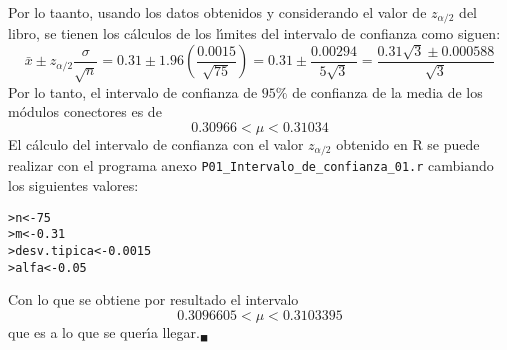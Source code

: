 \begin{solucion}
\begin{equation*}
 \end{equation*}
 Por lo taanto, usando los datos obtenidos y considerando el valor de $z_{\alpha/2}$ del libro, se tienen los c\'alculos de los l\'{\i}mites del intervalo de confianza como siguen:
 \begin{equation*}
  \bar{x}\pm z_{\alpha/2}\frac{\sigma}{\sqrt{n}} = 0.31\pm 1.96\left( \frac{0.0015}{\sqrt{75}} \right) = 0.31\pm\frac{0.00294}{5\sqrt{3}} = \frac{0.31\sqrt{3}\pm0.000588}{\sqrt{3}}
 \end{equation*}
 Por lo tanto, el intervalo de confianza de $95\%$ de confianza de la media de los m\'odulos conectores es de
 \begin{equation*}
  0.30966 < \mu < 0.31034
 \end{equation*}
 El c\'alculo del intervalo de confianza con el valor $z_{\alpha/2}$ obtenido en R se puede realizar con el programa anexo \texttt{P01\_Intervalo\_de\_confianza\_01.r} cambiando los siguientes valores:
 \begin{verbatim}
>n<-75
>m<-0.31
>desv.tipica<-0.0015
>alfa<-0.05
 \end{verbatim}
 \vspace{-0.5cm}
 Con lo que se obtiene por resultado el intervalo
 \begin{equation*}
  0.3096605 < \mu < 0.3103395
 \end{equation*}
 que es a lo que se quer\'{\i}a llegar.${}_{\blacksquare}$
\end{solucion}

